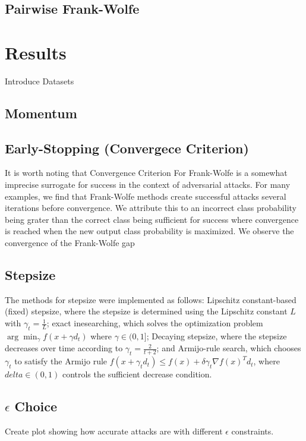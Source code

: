 \documentclass{article}
\begin{document}
\subsection{Pairwise Frank-Wolfe}

\section{Results}
Introduce Datasets
\subsection{Momentum}
\subsection{Early-Stopping (Convergece Criterion)}
It is worth noting that Convergence Criterion For Frank-Wolfe is a somewhat imprecise surrogate for success in the context of adversarial attacks. For many examples, we find that Frank-Wolfe methods create successful attacks several iterations before convergence. We attribute this to an incorrect class probability being grater than the correct class being sufficient for success where convergence is reached when the new output class probability is maximized. 
We observe the convergence of the Frank-Wolfe gap 
\subsection{Stepsize}
The methods for stepsize were implemented as follows: Lipschitz constant-based (fixed) stepsize, where the stepsize is determined using the Lipschitz constant \(L\) with \(\gamma_t = \frac{1}{L}\); exact inesearching, which solves the optimization problem \(\arg \min_{\gamma} f(x + \gamma d_t)\) where \(\gamma \in (0,1]\); Decaying stepsize, where the stepsize decreases over time according to \(\gamma_t = \frac{2}{t + 2}\); and Armijo-rule search, which chooses \(\gamma_t\) to satisfy the Armijo rule \(f(x + \gamma_t d_t) \leq f(x) + \delta \gamma_t \nabla f(x)^T d_t\), where \(delta \in (0,1)\) controls the sufficient decrease condition.



\subsection{$\epsilon$ Choice}
Create plot showing how accurate attacks are with different $\epsilon$ constraints.
\end{document}
